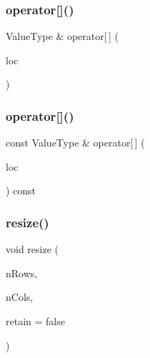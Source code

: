 \mbox{\label{classSparseGrid_afcc1243cd81603e13b8f223f0ceabe96}} 
\subsubsection{\texorpdfstring{operator[]()}{operator[]()}\hspace{0.1cm}{\footnotesize\ttfamily [3/4]}}
{\footnotesize\ttfamily Value\+Type \& operator\mbox{[}$\,$\mbox{]} (\begin{DoxyParamCaption}\item[{const \mbox{\hyperlink{structGridLocation}{Grid\+Location}} \&}]{loc }\end{DoxyParamCaption})}

\mbox{\label{classSparseGrid_a914315640e381831ab30403063205359}} 
\subsubsection{\texorpdfstring{operator[]()}{operator[]()}\hspace{0.1cm}{\footnotesize\ttfamily [4/4]}}
{\footnotesize\ttfamily const Value\+Type \& operator\mbox{[}$\,$\mbox{]} (\begin{DoxyParamCaption}\item[{const \mbox{\hyperlink{structGridLocation}{Grid\+Location}} \&}]{loc }\end{DoxyParamCaption}) const}

\mbox{\label{classSparseGrid_ace38e4e9ed81ae4ec651e4db9ab09db0}} 
\subsubsection{\texorpdfstring{resize()}{resize()}}
{\footnotesize\ttfamily void resize (\begin{DoxyParamCaption}\item[{int}]{n\+Rows,  }\item[{int}]{n\+Cols,  }\item[{bool}]{retain = {\ttfamily false} }\end{DoxyParamCaption})}

